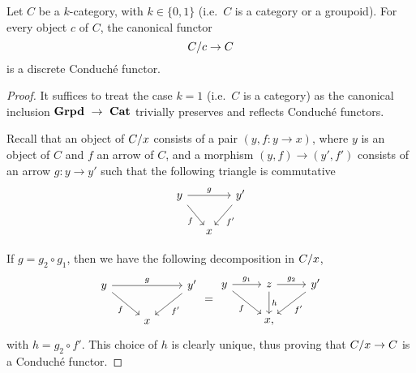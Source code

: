 
\begin{lemma}\label{lemma:slicescond}
  Let $C$ be a $k$\nbd-category, with $k \in \{0,1\}$ (i.e.\ $C$ is a
  category or a groupoid). For every object $c$ of $C$, the canonical
  functor
  \[
    C/c \to C
  \]
  is a discrete Conduché functor.
\end{lemma}
\begin{proof}
  It suffices to treat the case $k=1$ (i.e.\ $C$ is a category) as the canonical inclusion
  $\mathbf{Grpd}~\to~\mathbf{Cat}$ trivially preserves and reflects Conduché functors.

  Recall that an object of $C/x$ consists of a pair $(y,f \colon
  y \to x)$, where $y$ is an object of $C$ and $f$ an arrow of $C$,
  and a morphism $(y,f) \to (y',f')$ consists of an arrow $g \colon y
  \to y'$ such that the following triangle is commutative
  \[
    \begin{tikzcd}[column sep=small]
      y \ar[rr,"g"] \ar[dr,"f"'] && y'\ar[dl,"f'"] \\
      &x&
    \end{tikzcd}
  \]

  If $g=g_2\circ g_1$, then we have the following decomposition in
  $C/x$,
  \[
      \begin{tikzcd}
      y \ar[rr,"g"] \ar[dr,"f"'] && y'\ar[dl,"f'"] \\
      &x&
    \end{tikzcd}
    =
    \begin{tikzcd}
      y \ar[r,"g_1"] \ar[dr,"f"']& z \ar[r,"g_2"] \ar[d,"h"] &
      y' \ar[dl,"f'"] \\
      &x,&
    \end{tikzcd}
  \]
  with $h=g_2\circ f'$. This choice of $h$ is clearly unique, thus
  proving that $C/x \to C$ is a Conduché functor.
\end{proof}
